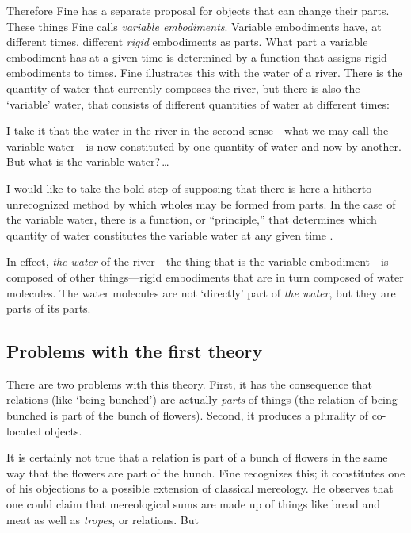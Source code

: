 \documentclass[11pt]{article}
\newenvironment{squote}{%
\begin{spacing}{1}
\begin{list}{}{%
\setlength{\labelwidth}{0pt}%
\rightmargin\leftmargin%
}
\item\relax
}{%
\end{list}%
\end{spacing}
}
\begin{document}
\begin{spacing}{1.5}
Therefore Fine has a separate proposal for objects that can change
their parts.  These things Fine calls {\em variable embodiments}.
Variable embodiments have, at different times, different {\em rigid}
embodiments as parts.  What part a variable embodiment has at a given
time is determined by a function that assigns rigid embodiments to
times.  Fine illustrates this with the water of a river.  There is the
quantity of water that currently composes the river, but there is also
the `variable' water, that consists of different quantities of water
at different times:

\begin{squote}
I take it that the water in the river in the second sense---what we may
call the variable water---is now constituted by one quantity of water
and now by another. But what is the variable water?\,\ldots

I would like to take the bold step of supposing that there is here a
hitherto unrecognized method by which wholes may be formed from parts.
In the case of the variable water, there is a function, or
``principle,'' that determines which quantity of water constitutes the
variable water at any given time \citeyearpar[68]{fine1999}.
\end{squote}

In effect, {\em the water} of the river---the thing that is the
variable embodiment---is composed of other things---rigid embodiments
that are in turn composed of water molecules.  The water molecules are
not `directly' part of {\em the water}, but they are parts of its
parts.

\subsection{Problems with the first theory}
\label{problems1}
There are two problems with this theory.  First, it has the
consequence that relations (like `being bunched') are actually {\em
  parts} of things (the relation of being bunched is part of the bunch
of flowers).  Second, it produces a plurality of co-located objects.

It is certainly not true that a relation is part of a bunch of flowers
in the same way that the flowers are part of the bunch.  Fine
recognizes this; it constitutes one of his objections to a possible
extension of classical mereology.  He observes that one could claim
that mereological sums are made up of things like bread and meat as
well as {\em tropes}, or relations.  But


\end{spacing}
\end{document}
